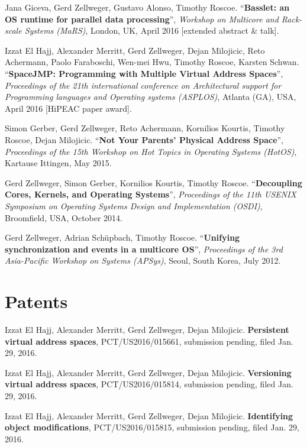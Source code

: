 \documentclass[margin,line]{cv}
\begin{document}
\begin{resume}
    Jana Giceva, Gerd Zellweger, Gustavo Alonso, Timothy Roscoe.
    ``\textbf{Basslet: an OS runtime for parallel data processing}'',
    \textsl{Workshop on Multicore and Rack-scale Systems (MaRS)}, London, UK, April 2016 [extended abstract \& talk].

    Izzat El Hajj, Alexander Merritt, Gerd Zellweger, Dejan Milojicic, Reto Achermann, Paolo Faraboschi, Wen-mei Hwu, Timothy Roscoe, Karsten Schwan.
    ``\textbf{SpaceJMP: Programming with Multiple Virtual Address Spaces}'',  \textsl{Proceedings of the 21th international conference on Architectural support for Programming languages and Operating systems (ASPLOS)}, Atlanta (GA), USA, April 2016 [HiPEAC paper award].

    Simon Gerber, Gerd Zellweger, Reto Achermann, Kornilios Kourtis, Timothy Roscoe, Dejan Milojicic.
    ``\textbf{Not Your Parents' Physical Address Space}'', \textsl{Proceedings of the 15th Workshop on Hot Topics in Operating Systems (HotOS)}, Kartause Ittingen, May 2015.

    Gerd Zellweger, Simon Gerber, Kornilios Kourtis, Timothy Roscoe.
    ``\textbf{Decoupling Cores, Kernels, and Operating Systems}'',
    \textsl{Proceedings of the 11th USENIX Symposium on Operating Systems Design and Implementation (OSDI)}, Broomfield, USA, October 2014.

    Gerd Zellweger, Adrian Schüpbach, Timothy Roscoe.
    ``\textbf{Unifying synchronization and events in a multicore OS}'',
    \textsl{Proceedings of the 3rd Asia-Pacific Workshop on Systems (APSys)}, Seoul, South Korea, July 2012.



    \section{\mysidestyle Patents}

    Izzat El Hajj, Alexander Merritt, Gerd Zellweger, Dejan Milojicic.
    \textbf{Persistent virtual address spaces}, PCT/US2016/015661, submission
    pending, filed Jan. 29, 2016.

    Izzat El Hajj, Alexander Merritt, Gerd Zellweger, Dejan Milojicic.
    \textbf{Versioning virtual address spaces}, PCT/US2016/015814, submission
    pending, filed Jan. 29, 2016.

    Izzat El Hajj, Alexander Merritt, Gerd Zellweger, Dejan Milojicic.
    \textbf{Identifying object modifications}, PCT/US2016/015815, submission
    pending, filed Jan. 29, 2016.


\end{resume}
\end{document}
